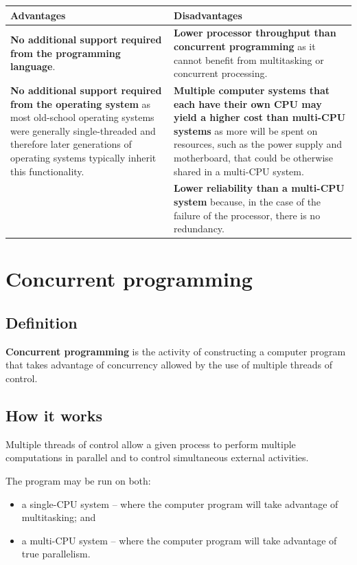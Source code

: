 \documentclass[a4paper]{systems-software}
\begin{document}
\begin{longtabu} to \textwidth {|X[1,l]|X[1,l]|}
    \hline
    \textbf{Advantages} & \textbf{Disadvantages}
    \\ \hline
    \textbf{No additional support required from the programming language}.
    &
    \textbf{Lower processor throughput than concurrent programming} as it cannot benefit from multitasking or concurrent processing.
    \\ \hline
  	\textbf{No additional support required from the operating system} as most old-school operating systems were generally single-threaded and therefore later generations of operating systems typically inherit this functionality.
    &
    \textbf{Multiple computer systems that each have their own CPU may yield a higher cost than multi-CPU systems} as more will be spent on resources, such as the power supply and motherboard, that could be otherwise shared in a multi-CPU system.
    \\ \hline
    &
    \textbf{Lower reliability than a multi-CPU system} because, in the case of the failure of the processor, there is no redundancy.
	\\ \hline
\end{longtabu}


\section*{Concurrent programming}

\subsection*{Definition}

\textbf{Concurrent programming} is the activity of constructing a computer program that takes advantage of concurrency allowed by the use of multiple threads of control.


\subsection*{How it works}

Multiple threads of control allow a given process to perform multiple computations in parallel and to control simultaneous external activities.

The program may be run on both:
\begin{itemize}
	\item a single-CPU system -- where the computer program will take advantage of multitasking; and
	\item a multi-CPU system -- where the computer program will take advantage of true parallelism.
\end{itemize}
\end{document}
